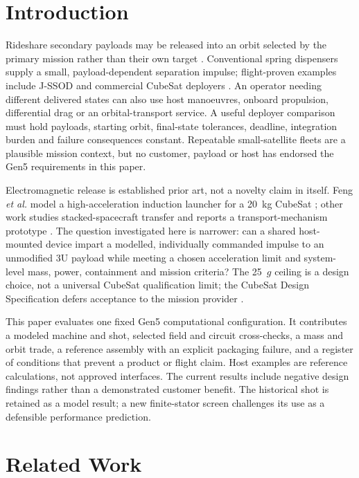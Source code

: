\documentclass[conference]{IEEEtran}
\begin{document}
\section{Introduction}
Rideshare secondary payloads may be released into an orbit selected by the primary mission rather than their own target \cite{soa}. Conventional spring dispensers supply a small, payload-dependent separation impulse; flight-proven examples include J-SSOD and commercial CubeSat deployers \cite{jssod,exopod}. An operator needing different delivered states can also use host manoeuvres, onboard propulsion, differential drag or an orbital-transport service. A useful deployer comparison must hold payloads, starting orbit, final-state tolerances, deadline, integration burden and failure consequences constant. Repeatable small-satellite fleets are a plausible mission context, but no customer, payload or host has endorsed the Gen5 requirements in this paper.

Electromagnetic release is established prior art, not a novelty claim in itself. Feng \emph{et al.} model a high-acceleration induction launcher for a 20~kg CubeSat \cite{feng2025}; other work studies stacked-spacecraft transfer and reports a transport-mechanism prototype \cite{stacked2022,xu2024,storage2025}. The question investigated here is narrower: can a shared host-mounted device impart a modelled, individually commanded impulse to an unmodified 3U payload while meeting a chosen acceleration limit and system-level mass, power, containment and mission criteria? The 25~$g$ ceiling is a design choice, not a universal CubeSat qualification limit; the CubeSat Design Specification defers acceptance to the mission provider \cite{cds}.

This paper evaluates one fixed Gen5 computational configuration. It contributes a modeled machine and shot, selected field and circuit cross-checks, a mass and orbit trade, a reference assembly with an explicit packaging failure, and a register of conditions that prevent a product or flight claim. Host examples are reference calculations, not approved interfaces. The current results include negative design findings rather than a demonstrated customer benefit. The historical shot is retained as a model result; a new finite-stator screen challenges its use as a defensible performance prediction.

\section{Related Work}
\end{document}
